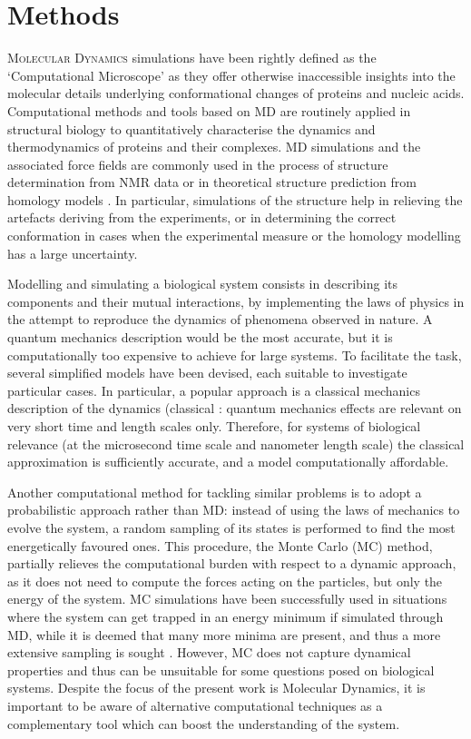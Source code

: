 \chapter{Methods} \label{chapter:MD}

\lettrine{M}{olecular Dynamics} simulations have been rightly defined as the `Computational Microscope' \citep{Lee2009,Dror2012} as they offer otherwise inaccessible insights into the molecular details underlying conformational changes of proteins and nucleic acids. Computational methods and tools based on MD are routinely applied in structural biology to quantitatively characterise the dynamics and thermodynamics of proteins and their complexes. MD simulations and the associated force fields are commonly used in the process of structure determination from NMR data or in theoretical structure prediction from homology models \citep{Vogel2017,Heo2018}. In particular, simulations of the structure help in relieving the artefacts deriving from the experiments, or in determining the correct conformation in cases when the experimental measure or the homology modelling has a large uncertainty.

Modelling and simulating a biological system consists in describing its components and their mutual interactions, by implementing the laws of physics in the attempt to reproduce the dynamics of phenomena observed in nature. A quantum mechanics description would be the most accurate, but it is computationally too expensive to achieve for large systems. To facilitate the task, several simplified models have been devised, each suitable to investigate particular cases.
%
In particular, a popular approach is a classical mechanics description of the dynamics (classical : quantum mechanics effects are relevant on very short time and length scales only. Therefore, for systems of biological relevance (at the microsecond time scale and nanometer length scale) the classical approximation is sufficiently accurate, and a model computationally affordable.

Another computational method for tackling similar problems is to adopt a probabilistic approach rather than MD: instead of using the laws of mechanics to evolve the system, a random sampling of its states is performed to find the most energetically favoured ones. This procedure, the Monte Carlo (MC) method, partially relieves the computational burden with respect to a dynamic approach, as it does not need to compute the forces acting on the particles, but only the energy of the system. MC simulations have been successfully used in situations where the system can get trapped in an energy minimum if simulated through MD, while it is deemed that many more minima are present, and thus a more extensive sampling is sought \citep{Liu2012}. However, MC does not capture dynamical properties and thus can be unsuitable for some questions posed on biological systems.
%
Despite the focus of the present work is Molecular Dynamics, it is important to be aware of alternative computational techniques as a complementary tool which can boost the understanding of the system.

